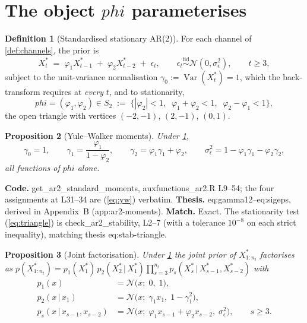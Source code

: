 \documentclass[11pt]{article}
\newcommand{\bphi}{\boldsymbol{\varphi}}
\newcommand{\Norm}{\mathcal{N}}
\newcommand{\given}{\,\vert\,}
\DeclareRobustCommand{\code}[1]{\texttt{#1}}
\newcommand{\eref}[1]{(\ref{#1})}
\def\bphi{phi}%
\def\boldsymbol#1{#1}%
\def\code#1{#1}%
\theoremstyle{plain}
\newtheorem{proposition}{Proposition}[section]
\theoremstyle{definition}
\newtheorem{definition}[proposition]{Definition}
\theoremstyle{remark}
\begin{document}
\section{The object $\bphi$ parameterises}
\label{sec:prior-object}

\begin{definition}[Standardised stationary AR(2)]\label{def:ar2}
For each channel of \cref{def:channels}, the prior is
\begin{equation}\label{eq:ar2-rec}
  X^{*}_t \;=\; \varphi_1 X^{*}_{t-1} \;+\; \varphi_2 X^{*}_{t-2} \;+\; \epsilon_t,
  \qquad \epsilon_t \overset{\text{iid}}{\sim} \Norm(0, \sigma_\epsilon^2),
  \qquad t \ge 3,
\end{equation}
subject to the unit-variance normalisation $\gamma_0 := \operatorname{Var}(X^{*}_t) = 1$,
which the back-transform requires at \emph{every} $t$, and to stationarity,
\begin{equation}\label{eq:triangle}
  \bphi = (\varphi_1, \varphi_2) \in S_2
  \;:=\;
  \bigl\{ |\varphi_2| < 1,\;\; \varphi_1 + \varphi_2 < 1,\;\; \varphi_2 - \varphi_1 < 1 \bigr\},
\end{equation}
the open triangle with vertices $(-2,-1)$, $(2,-1)$, $(0,1)$.
\end{definition}

\begin{proposition}[Yule--Walker moments]\label{prop:yw}
Under \cref{def:ar2},
\begin{equation}\label{eq:yw}
  \gamma_0 = 1,
  \qquad
  \gamma_1 = \frac{\varphi_1}{1 - \varphi_2},
  \qquad
  \gamma_2 = \varphi_1 \gamma_1 + \varphi_2,
  \qquad
  \sigma_\epsilon^2 = 1 - \varphi_1 \gamma_1 - \varphi_2 \gamma_2 ,
\end{equation}
all functions of $\bphi$ alone.
\end{proposition}

\noindent
\textbf{Code.} \code{get\_ar2\_standard\_moments}, \code{auxfunctions\_ar2.R}
L9--54; the four assignments at L31--34 are \eref{eq:yw} verbatim.
\textbf{Thesis.} \code{eq:gamma12}--\code{eq:sigeps}, derived in
Appendix~B (\code{app:ar2-moments}). \textbf{Match.} Exact. The stationarity
test \eref{eq:triangle} is \code{check\_ar2\_stability}, L2--7 (with a
tolerance $10^{-8}$ on each strict inequality), matching thesis
\code{eq:stab-triangle}.

\begin{proposition}[Joint factorisation]\label{prop:factor}
Under \cref{def:ar2} the joint prior of $X^{*}_{1:n_t}$ factorises as
$p(X^{*}_{1:n_t}) = p_1(X^{*}_1)\, p_2(X^{*}_2 \given X^{*}_1) \prod_{s=3}^{n_t} p_s(X^{*}_s \given X^{*}_{s-1}, X^{*}_{s-2})$
with
\begin{align}
  p_1(x) &= \Norm\!\bigl(x;\; 0,\; 1\bigr), \label{eq:p1}\\
  p_2(x \given x_1) &= \Norm\!\bigl(x;\; \gamma_1 x_1,\; 1 - \gamma_1^2\bigr), \label{eq:p2}\\
  p_s(x \given x_{s-1}, x_{s-2}) &= \Norm\!\bigl(x;\; \varphi_1 x_{s-1} + \varphi_2 x_{s-2},\; \sigma_\epsilon^2\bigr),
    \qquad s \ge 3. \label{eq:ps}
\end{align}
\end{proposition}
\end{document}
